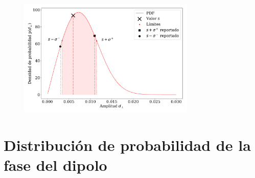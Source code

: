 \begin{figure}[H]
    \begin{small}
        \begin{center}
            \includegraphics[width=0.75\textwidth]{bessel_prob_ej_0-25_0-5.pdf}
        \end{center}
        \caption{}
    \end{small}
\end{figure}

\section{Distribución de probabilidad de la  fase del dipolo}